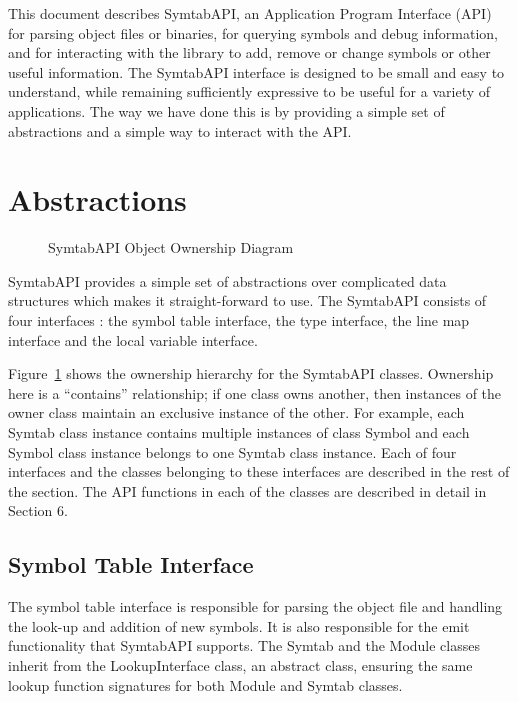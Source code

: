 This document describes SymtabAPI, an Application Program Interface (API) for
parsing object files or binaries, for querying symbols and debug information,
and for interacting with the library to add, remove or change symbols or other
useful information.  The SymtabAPI interface is designed to be small and easy to
understand, while remaining sufficiently expressive to be useful for a variety
of applications. The way we have done this is by providing a simple set of
abstractions and a simple way to interact with the API. 

\section{Abstractions}
\label{sec:intro}

\begin{figure}
    \caption{SymtabAPI Object Ownership Diagram}
    \label{fig:object-ownership}
\end{figure}

SymtabAPI provides a simple set of abstractions over complicated data structures
which makes it straight-forward to use. The SymtabAPI consists of four
interfaces : the symbol table interface, the type interface, the line map
interface and the local variable interface. 

Figure~\ref{fig:object-ownership} shows the ownership hierarchy for the
SymtabAPI classes. Ownership here is a ``contains'' relationship; if one
class owns another, then instances of the owner class maintain an exclusive
instance of the other. For example, each Symtab class instance contains multiple
instances of class Symbol and each Symbol class instance belongs to one Symtab
class instance. Each of four interfaces and the classes belonging to these
interfaces are described in the rest of the section. The API functions in each
of the classes are described in detail in Section 6.

\subsection{Symbol Table Interface}

The symbol table interface is responsible for parsing the object file and
handling the look-up and addition of new symbols. It is also responsible for the
emit functionality that SymtabAPI supports. The Symtab and the Module classes
inherit from the LookupInterface class, an abstract class, ensuring the same
lookup function signatures for both Module and Symtab classes. 

